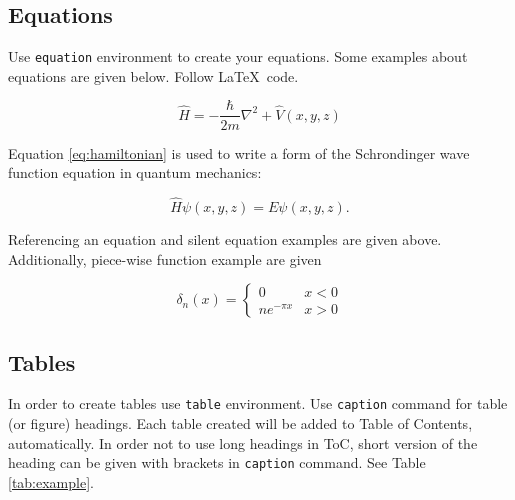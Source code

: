 \documentclass[a4paper,12pt]{article}
\begin{document}
\subsection{Equations}
Use \texttt{equation} environment to create your equations. Some examples about equations are given below. Follow \LaTeX~code.

\begin{equation}
    \hat{H} = - \frac{\hbar}{2m}\nabla^2 + \hat{V}(x,y,z)
    \label{eq:hamiltonian}
\end{equation}

Equation \ref{eq:hamiltonian} is used to write a form of the Schrondinger wave function equation in quantum mechanics:

\begin{equation*}
    \hat{H}\psi(x,y,z) = E\psi(x,y,z).
\end{equation*}

Referencing an equation and silent equation examples are given above. Additionally, piece-wise function example are given

\begin{equation}
    \delta_n(x) = 
    \begin{cases}
        0 & x < 0 \\
        ne^{-\pi x} & x > 0
    \end{cases}
\end{equation}


\subsection{Tables}
In order to create tables use \texttt{table} environment. Use \texttt{caption} command for table (or figure) headings. Each table created will be added to Table of Contents, automatically. In order not to use long headings in ToC, short version of the heading can be given with brackets in \texttt{caption} command. See Table \ref{tab:example}.
\end{document}
